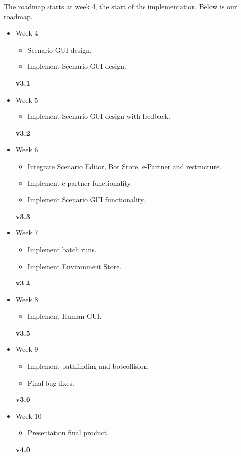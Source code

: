 The roadmap starts at week 4, the start of the implementation. Below is our roadmap.

\begin{itemize}
	\item Week 4
	\begin{itemize}
		\item Scenario GUI design.
		\item Implement Scenario GUI design.
	\end{itemize}
	\textbf{v3.1}
	\item Week 5
	\begin{itemize}
		\item Implement Scenario GUI design with feedback.
	\end{itemize}
	\textbf{v3.2}
	\item Week 6
	\begin{itemize}
		\item Integrate Scenario Editor, Bot Store, e-Partner and restructure.
		\item Implement \gls{e-partner} functionality.
		\item Implement Scenario GUI functionality.
	\end{itemize}
	\textbf{v3.3}
	\item Week 7
	\begin{itemize}
		\item Implement batch runs.
		\item Implement Environment Store.
	\end{itemize}
	\textbf{v3.4}
	\item Week 8
	\begin{itemize}
		\item Implement Human GUI.
	\end{itemize}
	\textbf{v3.5}
	\item Week 9 
	\begin{itemize}
		\item Implement \gls{pathfinding} and botcollision.
		\item Final bug fixes.
	\end{itemize}
	\textbf{v3.6}
	\item Week 10 
	\begin{itemize}
		\item Presentation final product.
	\end{itemize}
	\textbf{v4.0}
\end{itemize}
